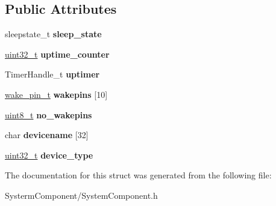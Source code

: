 \subsection*{Public Attributes}
\begin{DoxyCompactItemize}
\item 
\mbox{\label{structSystemHandle_ab28860e8cd27f2044dbfb8ddbc7cec0e}} 
sleepstate\+\_\+t {\bfseries sleep\+\_\+state}
\item 
\mbox{\label{structSystemHandle_a522b36afc2050fe91d4f6ec1b9f577d5}} 
\hyperlink{vl53l0x__types_8h_a435d1572bf3f880d55459d9805097f62}{uint32\+\_\+t} {\bfseries uptime\+\_\+counter}
\item 
\mbox{\label{structSystemHandle_a5468323d0aa250a10fb9d055b67056e6}} 
Timer\+Handle\+\_\+t {\bfseries uptimer}
\item 
\mbox{\label{structSystemHandle_a2c36e9ba1cee876046b1bcb694616fc0}} 
\hyperlink{structWakePin}{wake\+\_\+pin\+\_\+t} {\bfseries wakepins} \mbox{[}10\mbox{]}
\item 
\mbox{\label{structSystemHandle_a448522c01e063f5cb1e4b1331ca24e90}} 
\hyperlink{vl53l0x__types_8h_aba7bc1797add20fe3efdf37ced1182c5}{uint8\+\_\+t} {\bfseries no\+\_\+wakepins}
\item 
\mbox{\label{structSystemHandle_a0518ba1247836deb986f69a79fea30ca}} 
char {\bfseries devicename} \mbox{[}32\mbox{]}
\item 
\mbox{\label{structSystemHandle_ae58d7b6e51e8990c24a5260ecba10856}} 
\hyperlink{vl53l0x__types_8h_a435d1572bf3f880d55459d9805097f62}{uint32\+\_\+t} {\bfseries device\+\_\+type}
\end{DoxyCompactItemize}


The documentation for this struct was generated from the following file\+:\begin{DoxyCompactItemize}
\item 
Systerm\+Component/System\+Component.\+h\end{DoxyCompactItemize}
